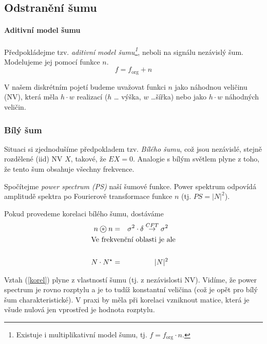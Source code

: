 
\subsection{Odstranění šumu}

\paragraph{Aditivní model šumu}
Předpokládejme tzv. {\em aditivní model šumu\footnote{Existuje i multiplikativní model šumu, tj. $f=f_{\mathrm{org}}\cdot n$.}}, neboli na signálu nezávislý šum. Modelujeme jej pomocí funkce $n$.
\begin{equation}
f=f_{\mathrm{org}}+n
\end{equation}

V našem diskrétním pojetí budeme uvažovat funkci $n$ jako náhodnou veličinu (NV), která měla $h\cdot w$ realizací ($h$ \dots
výška, $w$ \dots šířka) nebo jako $h\cdot w$ náhodných veličin. 

\subsubsection{Bílý šum}

Situaci si zjednodušíme předpokladem tzv. {\em Bílého šumu}, což jsou nezávislé, stejně rozdělené (iid) NV $X$, takové, že $EX=0$.
Analogie s bílým světlem plyne z toho, že tento šum obsahuje všechny frekvence. 

Spočítejme {\em power spectrum (PS)} naší
šumové funkce. Power spektrum odpovídá amplitudě spektra po Fourierově transformace funkce $n$ (tj. $PS=|N|^2$).
 
Pokud provedeme korelaci bílého šumu, dostáváme
\begin{eqnarray}
n\corr n&=&\sigma^2\cdot \delta\stackrel{CFT}{\rightarrow}\sigma^2\label{korel}\\
\noalign{\hbox{Ve frekvenční oblasti je ale}\nonumber}\\
N\cdot N^\star&=&|N|^2
\end{eqnarray}

Vztah (\ref{korel}) plyne z vlastností šumu (tj. z nezávislosti NV). Vidíme, že power spectrum je rovno rozptylu a je to tudíž 
konstantní veličina (což je opět pro bílý šum charakteristické). V praxi by měla při korelaci vzniknout matice,
která je všude nulová jen vprostřed je hodnota rozptylu.

